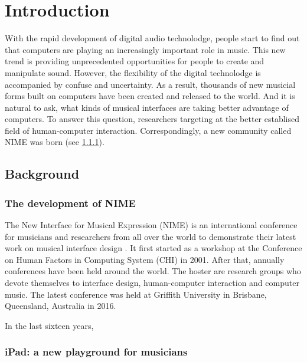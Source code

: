 \chapter{Introduction}

With the rapid development of digital audio technolodge, people start to find out that computers are playing an increasingly important role in music. This new trend is providing unprecedented opportunities for people to create and manipulate sound. However, the flexibility of the digital technolodge is accompanied by confuse and uncertainty. As a result, thousands of new musicial forms built on computers have been created and released to the world. And it is natural to ask, what kinds of musical interfaces are taking better advantage of computers. To answer this question, researchers targeting at the better establised field of human-computer interaction. Correspondingly, a new community called NIME was born (see \ref{subsec: nime}).

\section{Background}
\label{sec: backgound}

\subsection{The development of NIME}
\label{subsec: nime}
The New Interface for Musical Expression (NIME) is an international conference for musicians and researchers from all over the world to demonstrate their latest work on musical interface design \citep{Reference15}. It first started as a workshop at the Conference on Human Factors in Computing System (CHI) in 2001. After that, annually conferences have been held around the world. The hoster are research groups who devote themselves to interface design, human-computer interaction and computer music. The latest conference was held at Griffith University in Brisbane, Queensland, Australia in 2016.

In the last sixteen years,



\subsection{iPad: a new playground for musicians}

